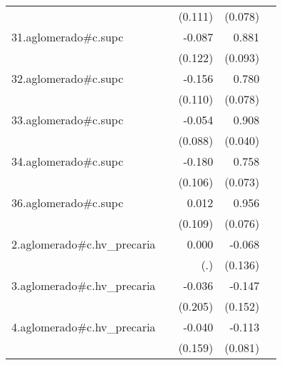 {\begin{longtable}{l*{4}{D{.}{.}{-1}}}
            &                     &     (0.111)         &     (0.078)         &                     \\
\addlinespace
31.aglomerado#c.supc&                     &      -0.087         &       0.881\sym{***}&                     \\
            &                     &     (0.122)         &     (0.093)         &                     \\
\addlinespace
32.aglomerado#c.supc&                     &      -0.156         &       0.780\sym{***}&                     \\
            &                     &     (0.110)         &     (0.078)         &                     \\
\addlinespace
33.aglomerado#c.supc&                     &      -0.054         &       0.908\sym{***}&                     \\
            &                     &     (0.088)         &     (0.040)         &                     \\
\addlinespace
34.aglomerado#c.supc&                     &      -0.180         &       0.758\sym{***}&                     \\
            &                     &     (0.106)         &     (0.073)         &                     \\
\addlinespace
36.aglomerado#c.supc&                     &       0.012         &       0.956\sym{***}&                     \\
            &                     &     (0.109)         &     (0.076)         &                     \\
\addlinespace
2.aglomerado#c.hv\_precaria&                     &       0.000         &      -0.068         &                     \\
            &                     &         (.)         &     (0.136)         &                     \\
\addlinespace
3.aglomerado#c.hv\_precaria&                     &      -0.036         &      -0.147         &                     \\
            &                     &     (0.205)         &     (0.152)         &                     \\
\addlinespace
4.aglomerado#c.hv\_precaria&                     &      -0.040         &      -0.113         &                     \\
            &                     &     (0.159)         &     (0.081)         &                     \\

\end{longtable}}
